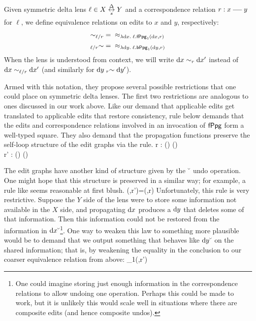 \begin{definition}
    Given symmetric delta lens $\ell \in X \sdlens Y$ and a correspondence
    relation $r : x \uedge y$ for $\ell$, we define equivalence relations on
    edits to $x$ and $y$, respectively:
    \begin{align*}
        \eqsharedl*\ell r &={} \under_{\lambda \dx.\;\ell.\mlfppg_1(\dx,r)} \\
        \eqsharedr*\ell r &={} \under_{\lambda \dy.\;\ell.\mlbppg_1(\dy,r)}
    \end{align*}
    When the lens is understood from context, we will write $\dx\eqsharedl
    r\dx'$ instead of $\dx\eqsharedl*\ell r\dx'$ (and similarly for
    $\dy\eqsharedr r\dy'$).
\end{definition}

Armed with this notation, they propose several possible restrictions that
one could place on symmetric delta lenses. The first two restrictions are
analogous to ones discussed in our work above. Like our demand that
applicable edits get translated to applicable edits that restore
consistency, rule  below demands that the edits and
correspondence relations involved in an invocation of $\mathsf{fPpg}$ form a
well-typed square. They also demand that the propagation functions preserve
the self-loop structure of the edit graphs via the  rule.
    {r  : \mldom(\dx) \uedge \mldom(\dy) \\
     r' : \mlcod(\dx) \uedge \mlcod(\dy)}

The edit graphs have another kind of structure given by the $\breve{\ }$
undo operation. One might hope that this structure is preserved in a similar
way; for example, a rule like  seems reasonable at first
blush.
    {\mlfppg(\dx\swoop,r')=(\dy\swoop,r)}
Unfortunately, this rule is very restrictive. Suppose the $Y$ side of the
lens were to store some information not available in the $X$ side, and
propagating $\textrm{d} x$ produces a $\textrm{d} y$ that deletes some of that information.
Then this information could not be restored from the information in
$\textrm{d} x\breve{\ }$\footnote{One could imagine storing just enough information in
the correspondence relations to allow undoing one operation. Perhaps this
could be made to work, but it is unlikely this would scale well in
situations where there are composite edits (and hence composite undos).}.
One way to weaken this law to something more plausible would be to demand
that we output something that behaves like $\textrm{d} y\breve{\ }$ on the shared
information; that is, by weakening the equality in the conclusion to our
coarser equivalence relation from above:
    {\mlfppg_1(\dx\swoop,r')  \dy\swoop}

